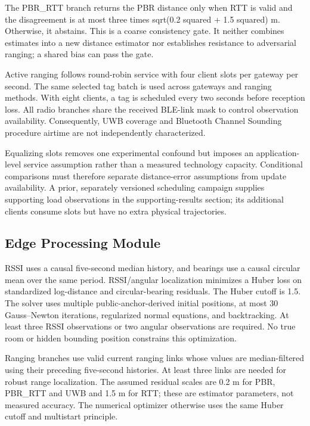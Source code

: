 \documentclass[12pt,a4paper]{report}
\begin{document}
The PBR\_RTT branch returns the PBR distance only when RTT is valid and the disagreement is at most three times sqrt(0.2 squared + 1.5 squared) m. Otherwise, it abstains. This is a coarse consistency gate. It neither combines estimates into a new distance estimator nor establishes resistance to adversarial ranging; a shared bias can pass the gate.

Active ranging follows round-robin service with four client slots per gateway per second. The same selected tag batch is used across gateways and ranging methods. With eight clients, a tag is scheduled every two seconds before reception loss. All radio branches share the received BLE-link mask to control observation availability. Consequently, UWB coverage and Bluetooth Channel Sounding procedure airtime are not independently characterized.

Equalizing slots removes one experimental confound but imposes an application-level service assumption rather than a measured technology capacity. Conditional comparisons must therefore separate distance-error assumptions from update availability. A prior, separately versioned scheduling campaign supplies supporting load observations in the supporting-results section; its additional clients consume slots but have no extra physical trajectories.

\subsection{Edge Processing Module}
RSSI uses a causal five-second median history, and bearings use a causal circular mean over the same period. RSSI/angular localization minimizes a Huber loss \cite{ref13} on standardized log-distance and circular-bearing residuals. The Huber cutoff is 1.5. The solver uses multiple public-anchor-derived initial positions, at most 30 Gauss--Newton iterations, regularized normal equations, and backtracking. At least three RSSI observations or two angular observations are required. No true room or hidden bounding position constrains this optimization.

Ranging branches use valid current ranging links whose values are median-filtered using their preceding five-second histories. At least three links are needed for robust range localization. The assumed residual scales are 0.2 m for PBR, PBR\_RTT and UWB and 1.5 m for RTT; these are estimator parameters, not measured accuracy. The numerical optimizer otherwise uses the same Huber cutoff and multistart principle.
\end{document}
